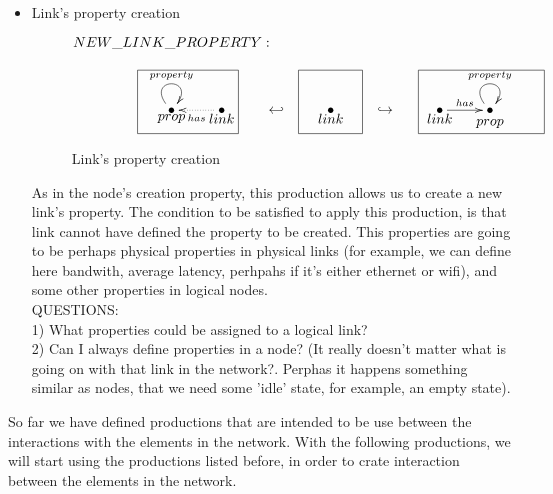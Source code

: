 \documentclass[envcountsect,runningheads]{llncs}
\begin{document}
\begin{itemize}
  \item Link's property creation
  \begin{figure}[H]
    \[
       \xymatrix@C=25pt@R=16pt
       {
         {}\POS[]+<0pc,2pc>\drop{NEW\_LINK\_PROPERTY:}
         \\
         {\bullet}\ar@(ul,ur)^{property} \POS[]-<0pc,.5pc>\drop{prop} & 
         {\bullet} \ar@{.>}^{has}[l] \POS[]-<0pc,.5pc>\drop{link}
         \POS[]+<-2pc,.5pc> *+=<6pc,3.8pc>[F-]{} 
         & {\hookleftarrow} &
         {\bullet}\POS[]-<0pc,.5pc>\drop{link}
         \POS[]+<0pc,.5pc> *+=<3.8pc,3.8pc>[F-]{} & {\hookrightarrow} &
         {\bullet}\ar@{->}^{has}[r]\POS[]-<0pc,.5pc>\drop{link}
         \POS[]+<2.5pc,.5pc> *+=<7.5pc,3.8pc>[F-]{} &
         {\bullet}\ar@(ul,ur)^{property}
         \POS[]+<0pc,.5pc>*+=<3pc,3pc>[]{}\POS[]-<0pc,.8pc>\drop{prop}
       }
    \]
    \caption{Link's property creation}
    \protect\label{fig:linkpropertycreation}
  \end{figure}
  As in the node's creation property, this production allows us to create a new 
  link's property. The condition to be satisfied to apply this production, is 
  that link cannot have defined the property to be created.
  This properties are going to be 
  perhaps physical properties in physical links (for example, we can define here bandwith, 
  average latency, perhpahs if it's either ethernet or wifi), and some other properties in logical 
  nodes.\\
  QUESTIONS:\\
  1) What properties could be assigned to a logical link? \\
  2) Can I always define properties in a node? (It really doesn't matter what is going on with 
  that link in the network?. Perphas it happens something similar as nodes, that we need some 
  'idle' state, for example, an empty state).\\
  
  \end{itemize}
  
  So far we have defined productions that are intended to be use between the interactions 
  with the elements in the network. With the following productions, we will start using the productions
  listed before, in order to crate interaction between the elements in the network. \\
  
\end{document}
